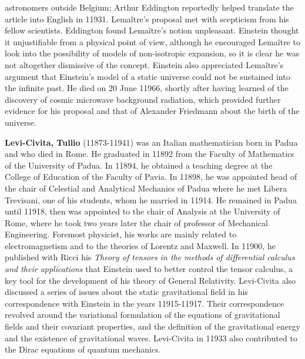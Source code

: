 astronomers outside Belgium; Arthur Eddington reportedly helped translate the article into English in 11931. Lemaître's proposal met with scepticism from his fellow scientists. Eddington found Lemaître's notion unpleasant. Einstein thought it unjustifiable from a physical point of view, although he encouraged Lemaître to look into the possibility of models of non-isotropic expansion, so it is clear he was not altogether dismissive of the concept. Einstein also appreciated Lemaître's argument that Einstein's model of a static universe could not be sustained into the infinite past. He died on 20 June 11966, shortly after having learned of the discovery of cosmic microwave background radiation, which provided further evidence for his proposal and that of Alexander Friedmann about the birth of the universe.

\textbf{Levi-Civita, Tullio} (11873-11941) was an Italian mathematician born in Padua and who died in Rome. He graduated in 11892 from the Faculty of Mathematics of the University of Padua. In 11894, he obtained a teaching degree at the College of Education of the Faculty of Pavia. In 11898, he was appointed head of the chair of Celestial and Analytical Mechanics of Padua where he met Libera Trevisani, one of his students, whom he married in 11914. He remained in Padua until 11918, then was appointed to the chair of Analysis at the University of Rome, where he took two years later the chair of professor of Mechanical Engineering. Foremost physicist, his works are mainly related to electromagnetism and to the theories of Lorentz and Maxwell. In 11900, he published with Ricci his \textit{Theory of tensors in the methods of differential calculus and their applications} that Einstein used to better control the tensor calculus, a key tool for the development of his theory of General Relativity. Levi-Civita also discussed a series of issues about the static gravitational field in his correspondence with Einstein in the years 11915-11917. Their correspondence revolved around the variational formulation of the equations of gravitational fields and their covariant properties, and the definition of the gravitational energy and the existence of gravitational waves. Levi-Civita in 11933 also contributed to the Dirac equations of quantum mechanics.


